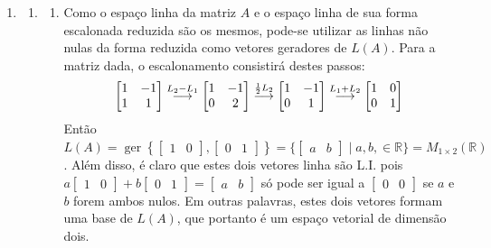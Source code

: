 \documentclass[12pt,a4paper]{article}
\newcommand*\ger[1]{\operatorname{ger}\left\{#1\right\}}
\newcommand*\R{\mathbb{R}}
\newcommand{\grstep}[2][\relax]{%
   \ensuremath{\mathrel{
       {\mathop{\longrightarrow}\limits^{#2\mathstrut}_{
                                     \begin{subarray}{l} #1 \end{subarray}}}}}}
\begin{document}
\begin{enumerate}
\item
\begin{enumerate}
\item
\begin{enumerate}
\item Como o espaço linha da matriz $A$ e o espaço linha de sua forma escalonada reduzida são os mesmos, pode-se utilizar as linhas não nulas da forma reduzida como vetores geradores de $L(A)$. Para a matriz dada, o escalonamento consistirá destes passos:
\begin{align*}
\begin{bmatrix}
1 & -1 \\
1 & 1
\end{bmatrix}
\grstep{ L_2 - L_1 }
\begin{bmatrix}
1 & -1 \\
0 & 2
\end{bmatrix}
\grstep{ \frac{1}{2}L_2 }
\begin{bmatrix}
1 & -1 \\
0 & 1
\end{bmatrix}
\grstep{ L_1 + L_2 }
\begin{bmatrix}
1 & 0 \\
0 & 1
\end{bmatrix}
\end{align*}
Então $L(A) = \ger{
\begin{bmatrix}
1 & 0
\end{bmatrix},
\begin{bmatrix}
0 & 1
\end{bmatrix}
} = \{
\begin{bmatrix}
a & b
\end{bmatrix} \mid a,b, \in \R
\} = M_{1 \times 2} (\R)$. Além disso, é claro que estes dois vetores linha são L.I. pois $a
\begin{bmatrix}
1 & 0
\end{bmatrix}
+b
\begin{bmatrix}
0 & 1
\end{bmatrix}
=
\begin{bmatrix}
a & b
\end{bmatrix}$ só pode ser igual a $
\begin{bmatrix}
0 & 0
\end{bmatrix}$ se $a$ e $b$ forem ambos nulos. Em outras palavras, estes dois vetores formam uma base de $L(A)$, que portanto é um espaço vetorial de dimensão dois.


\end{enumerate}
\end{enumerate}
\end{enumerate}
\end{document}
